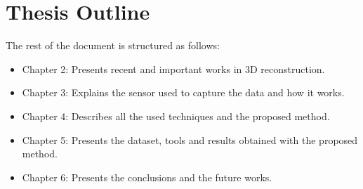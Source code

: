 \section{Thesis Outline}

The rest of the document is structured as follows:

\begin{itemize}
\item Chapter 2: Presents recent and important works in 3D reconstruction. 

\item Chapter 3: Explains the sensor used to capture the data and how it works.

\item Chapter 4: Describes all the used techniques and the proposed method.

\item Chapter 5: Presents the dataset, tools and results obtained with the proposed method.

\item Chapter 6: Presents the conclusions and the future works.
\end{itemize}
